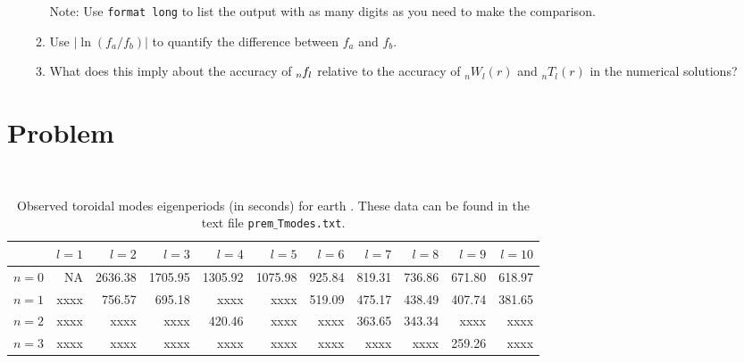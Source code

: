 \documentclass[11pt,titlepage,fleqn]{article}
\newcommand{\Tnl}{\mbox{${}_nT_l$}}   %
\newcommand{\Wnl}{\mbox{${}_nW_l$}}   %
\newcommand{\fnl}{\mbox{${}_{n\hspace{-0.2 mm}}f_l$}}        %
\newcommand{\blank}{xxxx}
\begin{document}
\begin{enumerate}
\begin{enumerate}
Note: Use \verb+format long+ to list the output with as many digits as you need to make the comparison.

\item Use $|\ln(f_a/f_b)|$ to quantify the difference between $f_a$ and $f_b$.

\item What does this imply about the accuracy of $\fnl$ relative to the accuracy of $\Wnl(r)$ and $\Tnl(r)$ in the numerical solutions?
\end{enumerate}

\end{enumerate}


\section*{Problem} \howmuchtime\



\begin{table}[b]
\centering
\caption[]
{{
Observed toroidal modes eigenperiods (in seconds) for earth \citep{PREM}. These data can be found in the text file {\tt prem$\_$Tmodes.txt}.
\label{tab:modes_obs}
}}
\begin{tabular}{||r|r|r|r|r|r|r|r|r|r|r||}
\hline
      & $l=1$ & $l=2$ & $l=3$ & $l=4$ & $l=5$ & $l=6$ & $l=7$ & $l=8$ & $l=9$ & $l=10$ \\ \hline\hline
$n=0$ & NA & 2636.38 & 1705.95 & 1305.92 & 1075.98 & 925.84 & 819.31 & 736.86 & 671.80 & 618.97 \\ \hline
$n=1$ & \blank & 756.57 & 695.18 & \blank & \blank & 519.09 & 475.17 & 438.49 & 407.74 & 381.65 \\ \hline
$n=2$ & \blank & \blank & \blank & 420.46 & \blank & \blank & 363.65 & 343.34 & \blank & \blank \\ \hline
$n=3$ & \blank & \blank & \blank & \blank & \blank & \blank & \blank & \blank & 259.26 & \blank \\ \hline
\hline
\end{tabular}
\end{table}
\end{document}
